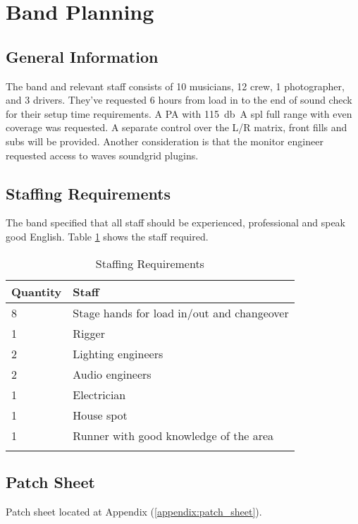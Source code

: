 \section{Band Planning}
    \subsection{General Information}
    The band and relevant staff consists of 10 musicians, 12 crew, 1 photographer, and 3 drivers. They've requested 6 hours from load in to the end of sound check for their setup time requirements. A PA with \SI{115}{\decibel\A} \acrshort{spl} full range with even coverage was requested. A separate control over the L/R matrix, front fills and subs will be provided. Another consideration is that the monitor engineer requested access to waves soundgrid plugins.

    \subsection{Staffing Requirements}
    The band specified that all staff should be experienced, professional and speak good English. Table \ref{tab:staffing} shows the staff required.

    \begin{longtable}[H]{|l|l|}
        \hline
        \textbf{Quantity} & \textbf{Staff} \\ \hline
        \endfirsthead
        \endhead
        8 & Stage hands for load in/out and changeover \\ \hline
        1 & Rigger \\ \hline
        2 & Lighting engineers \\ \hline
        2 & Audio engineers \\ \hline
        1 & Electrician \\ \hline
        1 & House spot \\ \hline
        1 & Runner with good knowledge of the area \\ \hline

        \caption{Staffing Requirements}
        \label{tab:staffing}
    \end{longtable}
    
    \subsection{Patch Sheet}
    Patch sheet located at Appendix (\ref{appendix:patch_sheet}). 

